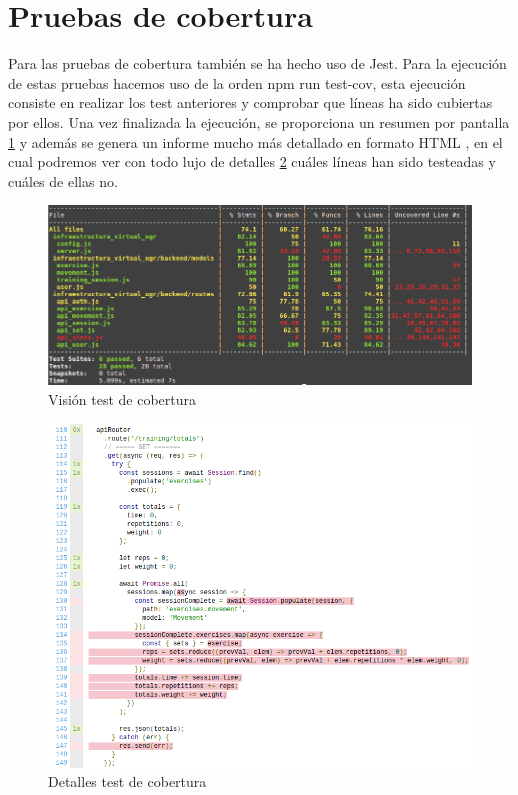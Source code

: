 \section {Pruebas de cobertura}
Para las pruebas de cobertura también se ha hecho uso de Jest. Para la ejecución de estas pruebas hacemos uso de la orden npm run test-cov, esta ejecución consiste en realizar los test anteriores y comprobar que líneas ha sido cubiertas por ellos. Una vez finalizada la ejecución, se proporciona un resumen por pantalla \ref{fig:cob} y además se genera un informe mucho más detallado en formato HTML , en el cual podremos ver con todo lujo de detalles \ref{fig:cobd} cuáles líneas han sido testeadas y cuáles de ellas no.

\begin{figure}
  \begin{center}
    \includegraphics[width=\textwidth]{imagenes/cov.png}
    \caption{Visión test de cobertura}
    \label{fig:cob}
  \end{center}
\end{figure}
\begin{figure}
  \begin{center}
    \includegraphics[width=\textwidth]{imagenes/cov_detail.png}
    \caption{Detalles test de cobertura}
    \label{fig:cobd}
  \end{center}
\end{figure}

